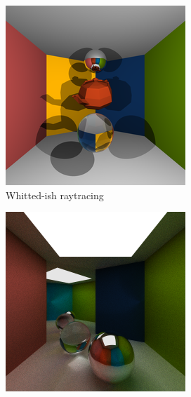 \documentclass[a4paper, twocolumn]{article}
\begin{document}
    \begin{figure}[ht]
        \centering
        \begin{subfigure}{0.48\linewidth}
            \centering
            \label{fig:whitted_raytracing}
            \includegraphics[width=\linewidth]{share/whitted_raytracing.png}
            \caption{Whitted-ish raytracing}
        \end{subfigure} \hfill
        \begin{subfigure}{0.48\linewidth}
            \centering
            \label{fig:monte_carlo_raytracing}
            \includegraphics[width=\linewidth]{share/monte_carlo_raytracing.png}

\end{subfigure}
\end{figure}
\end{document}
